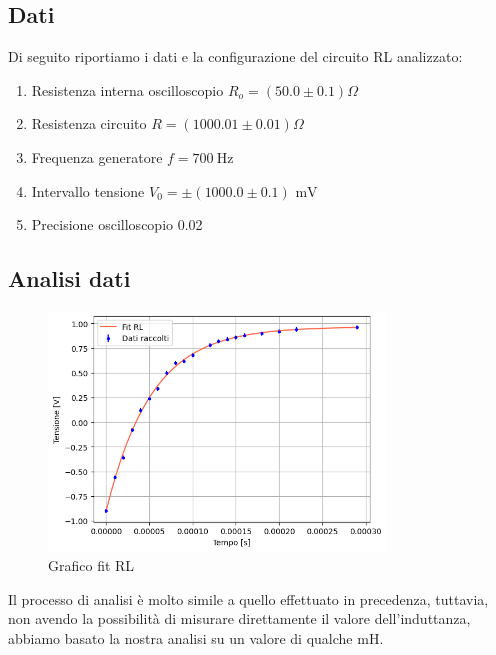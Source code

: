 \documentclass[letterpaper,12pt]{article}
\begin{document}
\subsection{Dati} %
Di seguito riportiamo i dati e la configurazione del circuito RL analizzato:
\begin{enumerate}[itemsep=1pt]
    \item Resistenza interna oscilloscopio $R_o = (50.0\pm0.1)\Omega$
    \item Resistenza circuito $R = (1000.01\pm0.01)\Omega$ %
    \item Frequenza generatore $f = \SI{700}{\hertz}$
    \item Intervallo tensione $V_0= \pm (1000.0\pm0.1)\text{ mV}$
    \item Precisione oscilloscopio 	0.02

    
\end{enumerate}

\subsection{Analisi dati}

\begin{figure}[h] 
  \centering
  \includegraphics[width=0.8\textwidth]{RL.png} %
  \caption{Grafico fit RL}
  \label{fig:fitRL}
\end{figure}

Il processo di analisi è molto simile a quello effettuato in precedenza, tuttavia, non avendo la possibilità di misurare direttamente il valore dell'induttanza, abbiamo basato la nostra analisi su un valore di qualche mH.\\
\end{document}
